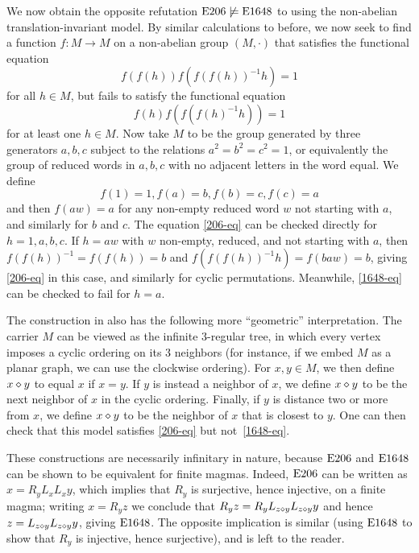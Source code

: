 \begin{example}\label{trans-nonab}  We now obtain the opposite refutation $\mathrm{E}206 \not\models \mathrm{E}1648$ to  using the non-abelian translation-invariant model.  By similar calculations to before, we now seek to find a function $f \colon M \to M$ on a non-abelian group $(M,\cdot)$ that satisfies the functional equation
\begin{equation}\label{206-eq}
 f(f(h)) f(f(f(h))^{-1} h) = 1
\end{equation}
for all $h \in M$, but fails to satisfy the functional equation
\begin{equation}\label{1648-eq}
   f(h) f(f(f(h)^{-1} h)) = 1
\end{equation}
for at least one $h \in M$.  Now take $M$ to be the group generated by three generators $a,b,c$ subject to the relations $a^2=b^2=c^2=1$, or equivalently the group of reduced words in $a,b,c$ with no adjacent letters in the word equal.  We define
$$ f(1) = 1, f(a)=b, f(b) = c, f(c) = a$$
and then $f(aw)=a$ for any non-empty reduced word $w$ not starting with $a$, and similarly for $b$ and $c$.  The equation \eqref{206-eq} can be checked directly for $h=1,a,b,c$.  If $h=aw$ with $w$ non-empty, reduced, and not starting with $a$, then $f(f(h))^{-1} = f(f(h)) = b$ and $f(f(f(h))^{-1} h) = f(baw) = b$, giving \eqref{206-eq} in this case, and similarly for cyclic permutations. Meanwhile, \eqref{1648-eq} can be checked to fail for $h=a$.
\end{example}

\begin{remark}  The construction in  also has the following more ``geometric'' interpretation.  The carrier $M$ can be viewed as the infinite $3$-regular tree, in which every vertex imposes a cyclic ordering on its $3$ neighbors (for instance, if we embed $M$ as a planar graph, we can use the clockwise ordering).  For $x,y \in M$, we then define $x \diamond y$ to equal $x$ if $x=y$.  If $y$ is instead a neighbor of $x$, we define $x \diamond y$ to be the next neighbor of $x$ in the cyclic ordering.  Finally, if $y$ is distance two or more from $x$, we define $x \diamond y$ to be the neighbor of $x$ that is closest to $y$.  One can then check that this model satisfies \eqref{206-eq} but not~\eqref{1648-eq}.
\end{remark}

\begin{remark} These constructions are necessarily infinitary in nature, because $\mathrm{E}206$ and $\mathrm{E}1648$ can be shown to be equivalent for finite magmas. Indeed, $\mathrm{E}206$ can be written as $x = R_y L_x L_x y$, which implies that $R_y$ is surjective, hence injective, on a finite magma; writing $x = R_y z$ we conclude that $R_y z = R_y L_{z \diamond y} L_{z \diamond y} y$ and hence $z = L_{z \diamond y} L_{z \diamond y} y$, giving $\mathrm{E}1648$.  The opposite implication is similar (using $\mathrm{E}1648$ to show that $R_y$ is injective, hence surjective), and is left to the reader.
\end{remark}

